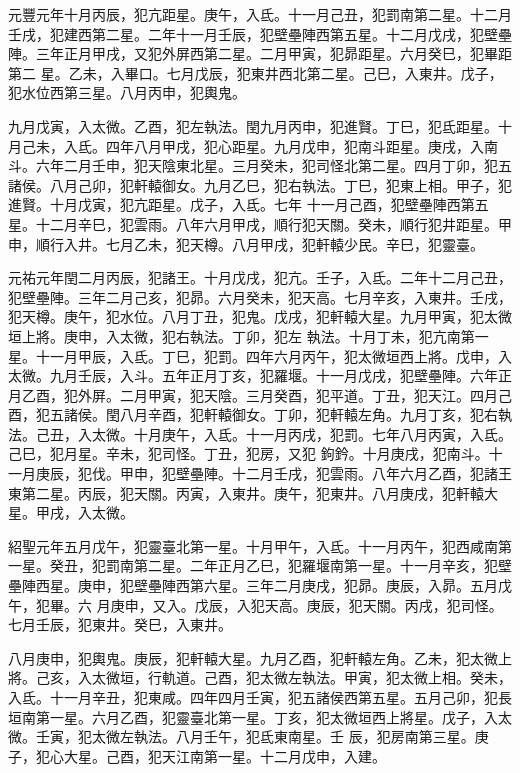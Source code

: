 \begin{pinyinscope}
 元豐元年十月丙辰，犯亢距星。庚午，入氐。十一月己丑，犯罰南第二星。十二月壬戌，犯建西第二星。二年十一月壬辰，犯壁壘陣西第五星。十二月戊戌，犯壁壘陣。三年正月甲戌，又犯外屏西第二星。二月甲寅，犯昴距星。六月癸巳，犯畢距第二
 星。乙未，入畢口。七月戊辰，犯東井西北第二星。己巳，入東井。戊子，犯水位西第三星。八月丙申，犯輿鬼。



 九月戊寅，入太微。乙酉，犯左執法。閏九月丙申，犯進賢。丁巳，犯氐距星。十月己未，入氐。四年八月甲戌，犯心距星。九月戊申，犯南斗距星。庚戌，入南斗。六年二月壬申，犯天陰東北星。三月癸未，犯司怪北第二星。四月丁卯，犯五諸侯。八月己卯，犯軒轅御女。九月乙巳，犯右執法。丁巳，犯東上相。甲子，犯進賢。十月戊寅，犯亢距星。戊子，入氐。七年
 十一月己酉，犯壁壘陣西第五星。十二月辛巳，犯雲雨。八年六月甲戌，順行犯天關。癸未，順行犯井距星。甲申，順行入井。七月乙未，犯天樽。八月甲戌，犯軒轅少民。辛巳，犯靈臺。



 元祐元年閏二月丙辰，犯諸王。十月戊戌，犯亢。壬子，入氐。二年十二月己丑，犯壁壘陣。三年二月己亥，犯昴。六月癸未，犯天高。七月辛亥，入東井。壬戌，犯天樽。庚午，犯水位。八月丁丑，犯鬼。戊戌，犯軒轅大星。九月甲寅，犯太微垣上將。庚申，入太微，犯右執法。丁卯，犯左
 執法。十月丁未，犯亢南第一星。十一月甲辰，入氐。丁巳，犯罰。四年六月丙午，犯太微垣西上將。戊申，入太微。九月壬辰，入斗。五年正月丁亥，犯羅堰。十一月戊戌，犯壁壘陣。六年正月乙酉，犯外屏。二月甲寅，犯天陰。三月癸酉，犯平道。丁丑，犯天江。四月己酉，犯五諸侯。閏八月辛酉，犯軒轅御女。丁卯，犯軒轅左角。九月丁亥，犯右執法。己丑，入太微。十月庚午，入氐。十一月丙戌，犯罰。七年八月丙寅，入氐。己巳，犯月星。辛未，犯司怪。丁丑，犯房，又犯
 鉤鈐。十月庚戌，犯南斗。十一月庚辰，犯伐。甲申，犯壁壘陣。十二月壬戌，犯雲雨。八年六月乙酉，犯諸王東第二星。丙辰，犯天關。丙寅，入東井。庚午，犯東井。八月庚戌，犯軒轅大星。甲戌，入太微。



 紹聖元年五月戊午，犯靈臺北第一星。十月甲午，入氐。十一月丙午，犯西咸南第一星。癸丑，犯罰南第二星。二年正月乙巳，犯羅堰南第一星。十一月辛亥，犯壁壘陣西星。庚申，犯壁壘陣西第六星。三年二月庚戌，犯昴。庚辰，入昴。五月戊午，犯畢。六
 月庚申，又入。戊辰，入犯天高。庚辰，犯天關。丙戌，犯司怪。七月壬辰，犯東井。癸巳，入東井。



 八月庚申，犯輿鬼。庚辰，犯軒轅大星。九月乙酉，犯軒轅左角。乙未，犯太微上將。己亥，入太微垣，行軌道。己酉，犯太微左執法。甲寅，犯太微上相。癸未，入氐。十一月辛丑，犯東咸。四年四月壬寅，犯五諸侯西第五星。五月己卯，犯長垣南第一星。六月乙酉，犯靈臺北第一星。丁亥，犯太微垣西上將星。戊子，入太微。壬寅，犯太微左執法。八月壬午，犯氐東南星。壬
 辰，犯房南第三星。庚子，犯心大星。己酉，犯天江南第一星。十二月戊申，入建。




\end{pinyinscope}
